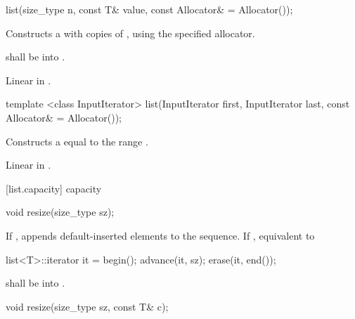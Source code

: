 %
%
\begin{itemdecl}
list(size_type n, const T& value, const Allocator& = Allocator());
\end{itemdecl}

\begin{itemdescr}
\pnum
\effects
Constructs a
with
copies of
,
using the specified allocator.

\pnum
\requires {} shall be  into .

\pnum
\complexity
Linear in
.
\end{itemdescr}

%
%
\begin{itemdecl}
template <class InputIterator>
  list(InputIterator first, InputIterator last, const Allocator& = Allocator());
\end{itemdecl}

\begin{itemdescr}
\pnum
\effects
Constructs a
equal to the range
.

\pnum
\complexity
Linear in
.
\end{itemdescr}

[list.capacity]{ capacity}

%
\begin{itemdecl}
void resize(size_type sz);
\end{itemdecl}

\begin{itemdescr}
\pnum
\effects
If ,
appends  default-inserted elements to the
sequence.
If , equivalent to

\begin{codeblock}
list<T>::iterator it = begin();
advance(it, sz);
erase(it, end());
\end{codeblock}


\pnum
\requires {} shall be
 into .
\end{itemdescr}

%
\begin{itemdecl}
void resize(size_type sz, const T& c);
\end{itemdecl}

